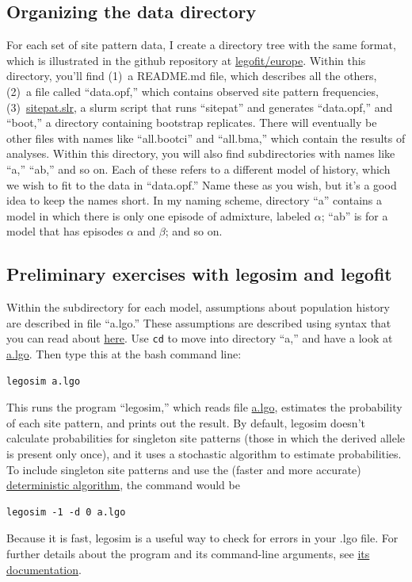 \documentclass[11pt]{article}
\begin{document}
\subsection{Organizing the data directory}
For each set of site pattern data, I create a directory tree with the
same format, which is illustrated in the github repository at
\href{https://github.com/alanrogers/agar22/tree/main/legofit/europe}{legofit/europe}. Within
this directory, you'll find (1)~a README.md file, which describes all
the others, (2)~a file called ``data.opf,'' which contains observed
site pattern frequencies, (3)~\href{sitepat.slr.html}{sitepat.slr}, a
slurm script that runs ``sitepat'' and generates ``data.opf,'' and
``boot,'' a directory containing bootstrap replicates.  There will
eventually be other files with names like ``all.bootci'' and
``all.bma,'' which contain the results of analyses.  Within this
directory, you will also find subdirectories with names like ``a,''
``ab,'' and so on. Each of these refers to a different model of
history, which we wish to fit to the data in ``data.opf.''  Name these
as you wish, but it's a good idea to keep the names short. In my
naming scheme, directory ``a'' contains a model in which there is only
one episode of admixture, labeled $\alpha$; ``ab'' is for a model that
has episodes $\alpha$ and $\beta$; and so on.

\subsection{Preliminary exercises with legosim and legofit}
Within the subdirectory for each model, assumptions about population
history are described in file ``a.lgo.''  These assumptions are
described using syntax that you can read about
\href{http://alanrogers.github.io/legofit/html/index.html#lgo}{here}.
Use \texttt{cd} to move into directory ``a,'' and have a look at
\href{https://github.com/alanrogers/agar22/tree/main/legofit/europe/a/a.lgo}{a.lgo}. Then
type this at the bash command line:
\begin{verbatim}
legosim a.lgo
\end{verbatim}
This runs the program ``legosim,'' which reads file
\href{https://github.com/alanrogers/agar22/tree/main/legofit/europe/a/a.lgo}{a.lgo},
estimates the probability of each site pattern, and prints out the
result. By default, legosim doesn't calculate probabilities for
singleton site patterns (those in which the derived allele is present
only once), and it uses a stochastic algorithm to estimate
probabilities. To include singleton site patterns and use the (faster
and more accurate)
\href{https://peercommunityjournal.org/articles/10.24072/pcjournal.132}{deterministic
  algorithm}, the command would be
\begin{verbatim}
legosim -1 -d 0 a.lgo
\end{verbatim}
Because it is fast, legosim is a useful way to check for errors in
your .lgo file. For further details about the program and its
command-line arguments, see
\href{http://alanrogers.github.io/legofit/html/legosim.html}{its
  documentation}.
\end{document}
